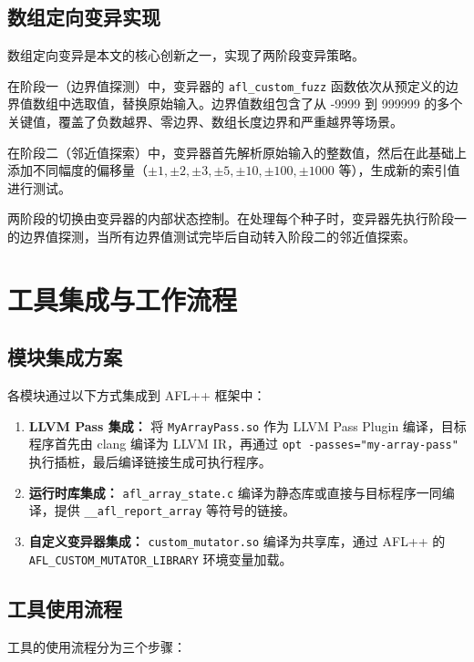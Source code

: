 \documentclass[bachelor]{njupthesis}
\begin{document}
\subsection{数组定向变异实现}

数组定向变异是本文的核心创新之一，实现了两阶段变异策略。

在阶段一（边界值探测）中，变异器的 \texttt{afl\_custom\_fuzz} 函数依次从预定义的边界值数组中选取值，替换原始输入。边界值数组包含了从 -9999 到 999999 的多个关键值，覆盖了负数越界、零边界、数组长度边界和严重越界等场景。

在阶段二（邻近值探索）中，变异器首先解析原始输入的整数值，然后在此基础上添加不同幅度的偏移量（$\pm 1, \pm 2, \pm 3, \pm 5, \pm 10, \pm 100, \pm 1000$ 等），生成新的索引值进行测试。

两阶段的切换由变异器的内部状态控制。在处理每个种子时，变异器先执行阶段一的边界值探测，当所有边界值测试完毕后自动转入阶段二的邻近值探索。

\section{工具集成与工作流程}

\subsection{模块集成方案}

各模块通过以下方式集成到 AFL++ 框架中：

\begin{enumerate}
    \item \textbf{LLVM Pass 集成：} 将 \texttt{MyArrayPass.so} 作为 LLVM Pass Plugin 编译，目标程序首先由 clang 编译为 LLVM IR，再通过 \texttt{opt -passes="my-array-pass"} 执行插桩，最后编译链接生成可执行程序。
    \item \textbf{运行时库集成：} \texttt{afl\_array\_state.c} 编译为静态库或直接与目标程序一同编译，提供 \texttt{\_\_afl\_report\_array} 等符号的链接。
    \item \textbf{自定义变异器集成：} \texttt{custom\_mutator.so} 编译为共享库，通过 AFL++ 的 \texttt{AFL\_CUSTOM\_MUTATOR\_LIBRARY} 环境变量加载。
\end{enumerate}

\subsection{工具使用流程}

工具的使用流程分为三个步骤：
\end{document}

